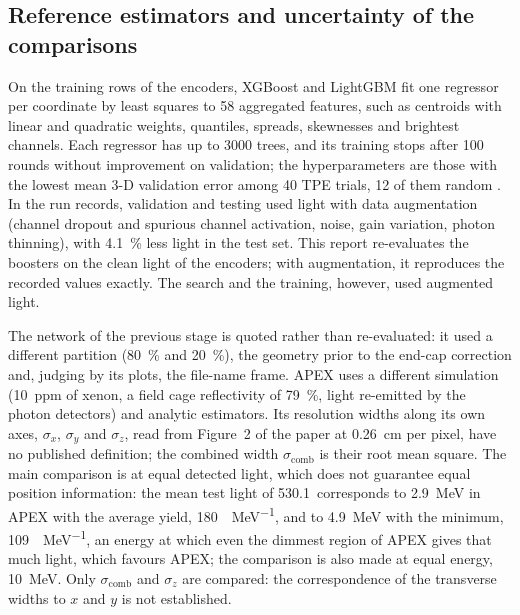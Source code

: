 \subsection{Reference estimators and uncertainty of the comparisons}
\label{sec:protocolo_comparacao}

On the training rows of the encoders, XGBoost and LightGBM \citep{chen2016xgboost,ke2017lightgbm} fit one regressor per coordinate by least squares to \num{58} aggregated features, such as centroids with linear and quadratic weights, quantiles, spreads, skewnesses and brightest channels. Each regressor has up to \num{3000} trees, and its training stops after \num{100} rounds without improvement on validation; the hyperparameters are those with the lowest mean \mbox{3-D} validation error among \num{40} TPE trials, \num{12} of them random \citep{akiba2019optuna}. In the run records, validation and testing used light with data augmentation (channel dropout and spurious channel activation, noise, gain variation, photon thinning), with \qty{4.1}{\percent} less light in the test set. This report re-evaluates the boosters on the clean light of the encoders; with augmentation, it reproduces the recorded values exactly. The search and the training, however, used augmented light.

The network of the previous stage \citep{vicentin2024study} is quoted rather than re-evaluated: it used a different partition (\qty{80}{\percent} and \qty{20}{\percent}), the geometry prior to the end-cap correction and, judging by its plots, the file-name frame. APEX \citep{marinho2025apex} uses a different simulation (\qty{10}{ppm} of xenon, a field cage reflectivity of \qty{79}{\percent}, light re-emitted by the photon detectors) and analytic estimators. Its resolution widths along its own axes, $\sigma_x$, $\sigma_y$ and $\sigma_z$, read from Figure~2 of the paper at \qty{0.26}{\cm} per pixel, have no published definition; the combined width $\sigma_{\mathrm{comb}}$ is their root mean square. The main comparison is at equal detected light, which does not guarantee equal position information: the mean test light of \qty{530.1}{\pe}\ corresponds to \qty{2.9}{\MeV} in APEX with the average yield, \qty{180}{\pe\per\MeV}, and to \qty{4.9}{\MeV} with the minimum, \qty{109}{\pe\per\MeV}, an energy at which even the dimmest region of APEX gives that much light, which favours APEX; the comparison is also made at equal energy, \qty{10}{\MeV}. Only $\sigma_{\mathrm{comb}}$ and $\sigma_z$ are compared: the correspondence of the transverse widths to $x$ and $y$ is not established.


